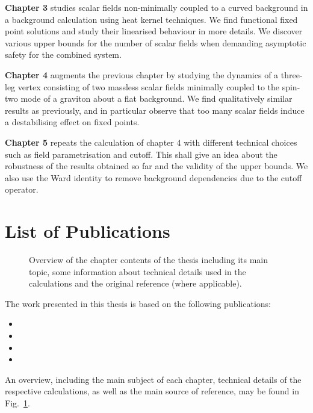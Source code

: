 \documentclass[11pt]{book}
\numberwithin{equation}{chapter}
\begin{document}
\medskip
\textbf{Chapter 3} studies scalar fields non-minimally coupled to a curved background
in a background calculation using heat kernel techniques. We find functional fixed point
solutions and study their linearised behaviour in more details. We discover various
upper bounds for the number of scalar fields when demanding asymptotic safety for
the combined system.

\medskip
\textbf{Chapter 4} augments the previous chapter by studying the dynamics
of a three-leg vertex consisting of two massless scalar fields minimally coupled to
the spin-two mode of a graviton about a flat background.
We find qualitatively similar results as previously, and in particular observe
that too many scalar fields induce a destabilising effect on fixed points.

\medskip
\textbf{Chapter 5} repeats the calculation of chapter 4 with different technical choices
such as field parametrisation and cutoff. This shall give an idea about the
robustness of the results obtained so far and the validity of the upper bounds.
We also use the Ward identity to remove background dependencies due to the
cutoff operator.


\section*{List of Publications}

\begin{figure}
  \begin{center}
    
  \end{center}
  \caption{
    Overview of the chapter contents of the thesis including its main topic, some information
    about technical details used in the calculations and the original reference (where applicable).
  }
  \label{fig:overview}
\end{figure}

The work presented in this thesis is based on the following publications:%
\bigskip
\begin{itemize}
  \setlength\itemsep{0.7em}
  \item {}
  \item {}
  \item {}
  \item {}
\end{itemize}
\bigskip
An overview, including the main subject of each chapter, technical details
of the respective calculations, as well as the main source of reference, may be found in
Fig.~\ref{fig:overview}.
\end{document}

